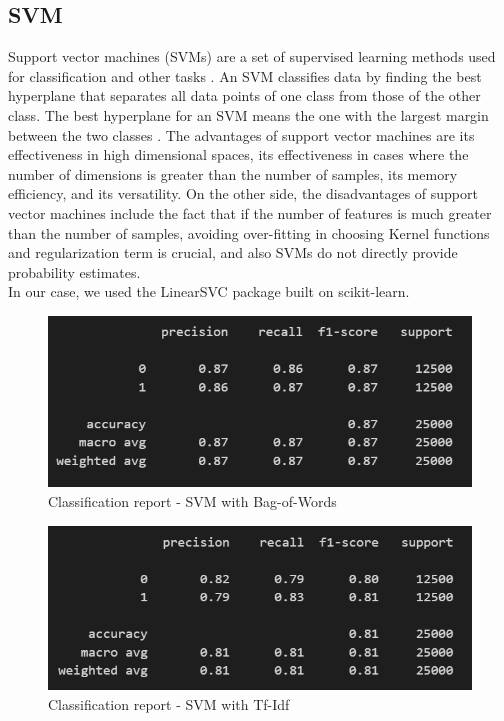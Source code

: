 \documentclass[fleqn,10pt]{SelfArx} %
\begin{document}
\subsection{SVM}
Support vector machines (SVMs) are a set of supervised learning methods used for classification and other tasks \cite{SVM}. An SVM classifies data by finding the best hyperplane that separates all data points of one class from those of the other class. The best hyperplane for an SVM means the one with the largest margin between the two classes \cite{SVM2}. The advantages of support vector machines are its effectiveness in high dimensional spaces, its effectiveness in cases where the number of dimensions is greater than the number of samples, its memory efficiency, and its versatility. On the other side, the disadvantages of support vector machines include the fact that if the number of features is much greater than the number of samples, avoiding over-fitting in choosing Kernel functions and regularization term is crucial, and also SVMs do not directly provide probability estimates.\\
In our case, we used the LinearSVC package built on scikit-learn.

\begin{figure}[H]
\begin{center}
  \includegraphics[scale=0.6]{./images/SVM_BoW.png}
\end{center}
  \caption{Classification report - SVM with Bag-of-Words}
\end{figure}

\begin{figure}[H]
\begin{center}
  \includegraphics[scale=0.6]{./images/SVM_TFIDF.png}
\end{center}
  \caption{Classification report - SVM with Tf-Idf}
\end{figure}
\end{document}
